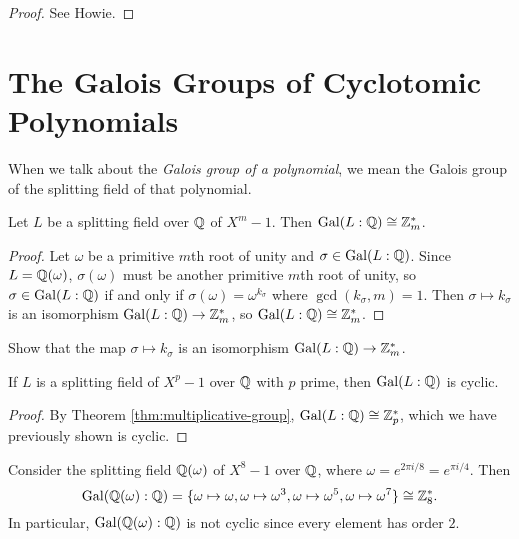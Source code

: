 \begin{proof}
  See Howie.
\end{proof}

\section{The Galois Groups of Cyclotomic Polynomials}
\begin{remark}
  When we talk about the \emph{Galois group of a
  polynomial},
  we mean the Galois group of the splitting field of
  that polynomial.
\end{remark}

\begin{theorem}
  \label{thm:multiplicative-group}
  Let $L$ be a splitting field over $\mathbb{Q}$
  of $X^m - 1$. Then
  $\operatorname{Gal}(L : \mathbb{Q}) \cong \mathbb{Z}_m^*$.
\end{theorem}

\begin{proof}
  Let $\omega$ be a primitive $m$th root of unity and
  $\sigma \in \operatorname{Gal}(L : \mathbb{Q})$. Since
  $L = \mathbb{Q}(\omega)$, $\sigma(\omega)$ must be another
  primitive $m$th root of unity, so
  $\sigma \in \operatorname{Gal}(L : \mathbb{Q})$ if and only if
  $\sigma(\omega) = \omega^{k_\sigma}$
  where $\gcd(k_\sigma, m) = 1$. Then
  $\sigma \mapsto k_\sigma$ is an isomorphism
  $\operatorname{Gal}(L : \mathbb{Q}) \to \mathbb{Z}_m^*$, so $\operatorname{Gal}(L : \mathbb{Q}) \cong \mathbb{Z}_m^*$.
\end{proof}

\begin{exercise}
  Show that the map $\sigma \mapsto k_\sigma$ is an
  isomorphism $\operatorname{Gal}(L : \mathbb{Q}) \to \mathbb{Z}_m^*$.
\end{exercise}

\begin{corollary}
  If $L$ is a splitting field of $X^p - 1$ over $\mathbb{Q}$
  with $p$ prime, then $\operatorname{Gal}(L : \mathbb{Q})$ is cyclic.
\end{corollary}

\begin{proof}
  By Theorem \ref{thm:multiplicative-group},
  $\operatorname{Gal}(L : \mathbb{Q}) \cong \mathbb{Z}_p^*$, which we have previously
  shown is cyclic.
\end{proof}

\begin{example}
  Consider the splitting field $\mathbb{Q}(\omega)$ of $X^8 - 1$
  over $\mathbb{Q}$, where $\omega = e^{2\pi i / 8} = e^{\pi i / 4}$.
  Then
  \[
    \operatorname{Gal}(\mathbb{Q}(\omega) : \mathbb{Q})
    = \{\omega \mapsto \omega, \omega \mapsto \omega^3, \omega \mapsto \omega^5, \omega \mapsto \omega^7\}
    \cong \mathbb{Z}_8^*.
  \]
  In particular, $\operatorname{Gal}(\mathbb{Q}(\omega) : \mathbb{Q})$ is not cyclic
  since every element has order $2$.
\end{example}

